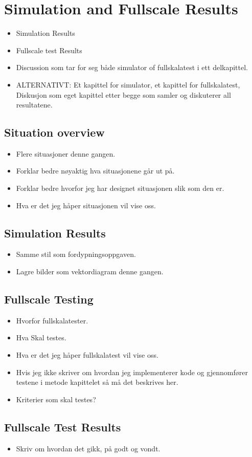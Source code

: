 \section{Simulation and Fullscale Results}
\begin{itemize}
    \item Simulation Results
    \item Fullscale test Results
    \item Discussion som tar for seg både simulator of fullskalatest i ett delkapittel.
    \item ALTERNATIVT: Et kapittel for simulator, et kapittel for fullskalatest, Diskusjon som eget kapittel etter begge som samler og diskuterer all resultatene.
\end{itemize}

\subsection{Situation overview}
\begin{itemize}
    \item Flere situasjoner denne gangen.
    \item Forklar bedre nøyaktig hva situasjonene går ut på.
    \item Forklar bedre hvorfor jeg har designet situasjonen slik som den er.
    \item Hva er det jeg håper situasjonen vil vise oss.
\end{itemize}

\subsection{Simulation Results}
\begin{itemize}
    \item Samme stil som fordypningsoppgaven.
    \item Lagre bilder som vektordiagram denne gangen.
\end{itemize}

\subsection{Fullscale Testing}
\begin{itemize}
    \item Hvorfor fullskalatester.
    \item Hva Skal testes.
    \item Hva er det jeg håper fullskalatest vil vise oss.
    \item Hvis jeg ikke skriver om hvordan jeg implementerer kode og gjennomfører testene i metode kapittelet så må det beskrives her.
    \item Kriterier som skal testes?
\end{itemize}

\subsection{Fullscale Test Results}
\begin{itemize}
    \item Skriv om hvordan det gikk, på godt og vondt.
\end{itemize}

\newpage